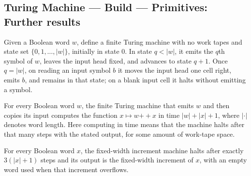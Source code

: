 \subsection*{Turing Machine --- Build --- Primitives: Further results}

\begin{definition}
\label{Turing.FinTM.prependTM}
\leanok
{}
Given a Boolean word $w$, define a finite Turing machine with no work tapes and state
set $\{0,1,\ldots,|w|\}$, initially in state $0$. In state $q<|w|$, it emits the $q$th
symbol of $w$, leaves the input head fixed, and advances to state $q+1$. Once $q=|w|$,
on reading an input symbol $b$ it moves the input head one cell right, emits $b$, and
remains in that state; on a blank input cell it halts without emitting a symbol.
\end{definition}

\begin{theorem}
\label{Turing.FinTM.prependTM_computes}
\leanok
{}
For every Boolean word $w$, the finite Turing machine that emits $w$ and then copies its
input computes the function $x\mapsto w\mathbin{++}x$ in time $|w|+|x|+1$, where
$|\cdot|$ denotes word length. Here computing in time means that the machine halts after
that many steps with the stated output, for some amount of work-tape space.
\end{theorem}

\begin{theorem}
\label{Turing.FinTM.incFixedTM_computes}
\leanok
{}
For every Boolean word $x$, the fixed-width increment machine halts after exactly
$3(|x|+1)$ steps and its output is the fixed-width increment of $x$, with an empty word
used when that increment overflows.
\end{theorem}


